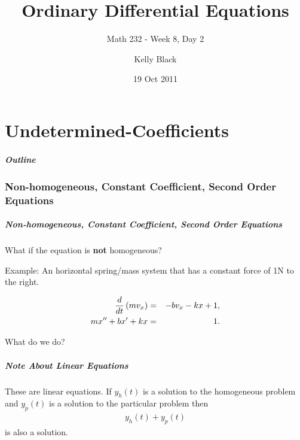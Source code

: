 \part{Undetermined-Coefficients}


\title{Ordinary Differential Equations}
\subtitle{Math 232 - Week 8, Day 2}

\author{Kelly Black}
\date{19 Oct 2011}

\begin{frame}
  \titlepage
\end{frame}

\begin{frame}
  \frametitle{Outline}
\end{frame}


\section{Non-homogeneous, Constant Coefficient, Second Order Equations}


\begin{frame}
  \frametitle{Non-homogeneous, Constant Coefficient, Second Order
    Equations}
  What if the equation is \textbf{not} homogeneous?

  Example: An horizontal spring/mass system that has a constant force
  of 1N to the right.

  \begin{eqnarray*}
    \frac{d}{dt} \left( m v_x \right) & = & -b v_x - kx + 1, \\
    m x'' + bx' + kx & = & 1.
  \end{eqnarray*}

  What do we do?


\end{frame}


\begin{frame}
  \frametitle{Note About Linear Equations}

  These are linear equations. If $y_h(t)$ is a solution to the
  homogeneous problem and $y_p(t)$ is a solution to the particular
  problem then
  \begin{eqnarray*}
    y_h(t) + y_p(t)
  \end{eqnarray*}
  is also a solution.

\end{frame}



